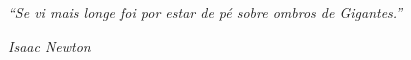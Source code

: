 \newpage

\vspace*{10cm}
\hspace{4cm}\begin{minipage}{.51\textwidth}

\textit{``Se vi mais longe foi por estar de pé sobre ombros de Gigantes.'' }

\begin{flushright}\itshape Isaac Newton \upshape\end{flushright}

\end{minipage}